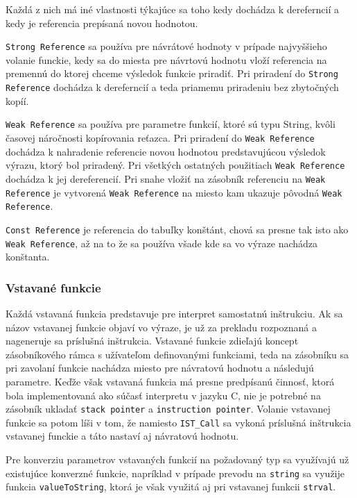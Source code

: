 \documentclass[12pt,a4paper,titlepage,final]{article}
\begin{document}
Každá z nich má iné vlastnosti týkajúce sa toho kedy dochádza k dereferncií a kedy
je referencia prepísaná novou hodnotou.

\texttt{Strong Reference} sa používa pre návrátové hodnoty v prípade najvyššieho volanie funckie,
kedy sa do miesta pre návrtovú hodnotu vloží referencia na premennú do ktorej chceme
výsledok funkcie priradiť. Pri priradení do \texttt{Strong Reference} dochádza k dereferncií a teda
priamemu priradeniu bez zbytočných kopíí.

\texttt{Weak Reference} sa používa pre parametre funkcií, ktoré sú typu String, kvôli časovej náročnosti
kopírovania reťazca. Pri priradení do \texttt{Weak Reference} dochádza k nahradenie referencie
novou hodnotou predstavujúcou výsledok výrazu, ktorý bol priradený. Pri všetkých ostatných použitiach
\texttt{Weak Reference} dochádza k jej dereferencií. Pri snahe vložiť na zásobník referenciu na \texttt{Weak Reference}
je vytvorená \texttt{Weak Reference} na miesto kam ukazuje pôvodná \texttt{Weak Reference}.

\texttt{Const Reference} je referencia do tabuľky konštánt, chová sa presne tak isto ako \texttt{Weak Reference},
až na to že sa používa všade kde sa vo výraze nachádza konštanta.

\subsubsection{Vstavané funkcie}
Každá vstavaná funkcia predstavuje pre interpret samostatnú inštrukciu. Ak sa
názov vstavanej funkcie objaví vo výraze, je už za prekladu rozpoznaná a 
nageneruje sa príslušná inštrukcia. Vstavané funkcie zdieľajú koncept zásobníkového
rámca s užívateľom definovanými funkciami, teda na zásobníku sa pri zavolaní funkcie 
nachádza miesto pre návratovú hodnotu a následujú parametre. Keďže však vstavaná funkcia
má presne predpísanú činnosť, ktorá bola implementovaná ako súčasť interpretu v jazyku C,
nie je potrebné na zásobník ukladať \texttt{stack pointer} a \texttt{instruction pointer}.
Volanie vstavanej funkcie sa potom líši v tom, že namiesto \texttt{IST\_Call} sa vykoná 
príslušná inštrukcia vstavanej funckie a táto nastaví aj návratovú hodnotu.

Pre konverziu parametrov vstavaných funkcií na požadovaný typ sa využívajú už existujúce
konverzné funkcie, napríklad v prípade prevodu na \texttt{string} sa využije funkcia
\texttt{valueToString}, ktorá je však využitá aj pri vstavanej funkcii \texttt{strval}.
\end{document}
